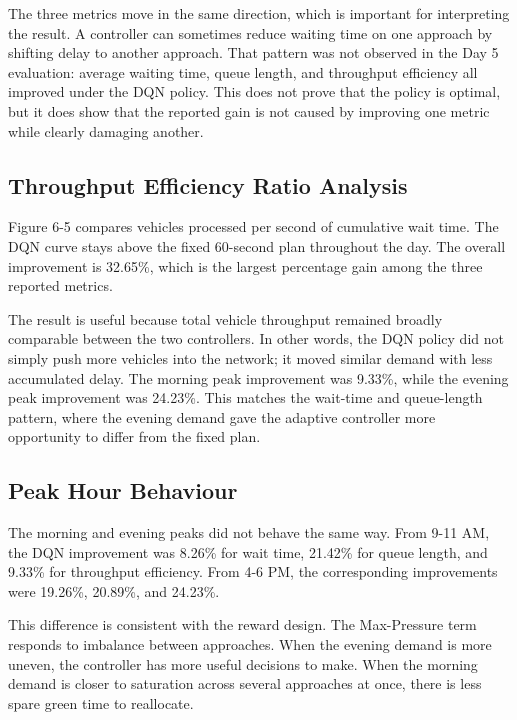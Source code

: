 The three metrics move in the same direction, which is important for
interpreting the result. A controller can sometimes reduce waiting time
on one approach by shifting delay to another approach. That pattern was
not observed in the Day 5 evaluation: average waiting time, queue length,
and throughput efficiency all improved under the DQN policy. This does
not prove that the policy is optimal, but it does show that the reported
gain is not caused by improving one metric while clearly damaging
another.

\subsection{Throughput Efficiency Ratio Analysis}
\label{subsec:throughput_efficiency_ratio_analysis}

Figure 6-5 compares vehicles processed per second of cumulative wait
time. The DQN curve stays above the fixed 60-second plan throughout the
day. The overall improvement is 32.65\%, which is the largest percentage
gain among the three reported metrics.

The result is useful because total vehicle throughput remained broadly
comparable between the two controllers. In other words, the DQN policy
did not simply push more vehicles into the network; it moved similar
demand with less accumulated delay. The morning peak improvement was
9.33\%, while the evening peak improvement was 24.23\%. This matches the
wait-time and queue-length pattern, where the evening demand gave the
adaptive controller more opportunity to differ from the fixed plan.

\subsection{Peak Hour Behaviour}
\label{subsec:peak_hour_behaviour}

The morning and evening peaks did not behave the same way. From 9-11 AM,
the DQN improvement was 8.26\% for wait time, 21.42\% for queue length,
and 9.33\% for throughput efficiency. From 4-6 PM, the corresponding
improvements were 19.26\%, 20.89\%, and 24.23\%.

This difference is consistent with the reward design. The Max-Pressure
term responds to imbalance between approaches. When the evening demand is
more uneven, the controller has more useful decisions to make. When the
morning demand is closer to saturation across several approaches at once,
there is less spare green time to reallocate.

